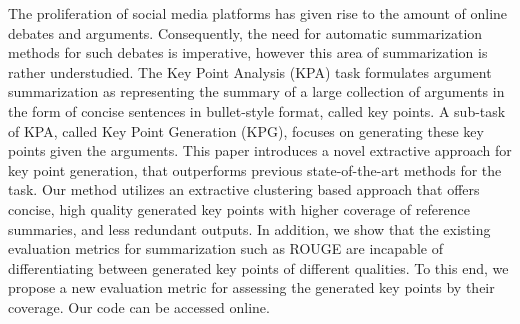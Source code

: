 The proliferation of social media platforms has given rise to the amount of online debates and arguments. Consequently, the need for automatic summarization methods for such debates is imperative, however this area of summarization is rather understudied. The  Key Point Analysis (KPA) task formulates argument summarization as representing the summary of a large collection of  arguments in the form of concise sentences in bullet-style format, called key points. A sub-task of KPA, called Key Point Generation (KPG), focuses on generating these key points given the arguments. This paper introduces a novel extractive approach for key point generation, that outperforms previous state-of-the-art methods for the task. Our method utilizes an extractive clustering based approach that offers concise, high quality generated key points with higher coverage of reference summaries, and less redundant outputs. In addition, we show that the existing evaluation metrics for summarization such as ROUGE are incapable of differentiating between generated key points of different qualities. To this end, we propose a new evaluation metric for assessing the generated key points by their coverage.  Our code can be accessed online.
